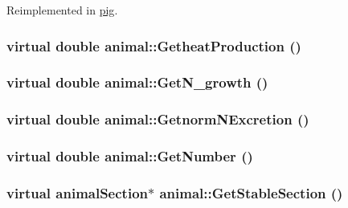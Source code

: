 Reimplemented in \hyperlink{classpig_aeb56ca7a77c1f27b7bc90ee4df0d4d1f}{pig}.\hypertarget{classanimal_a1530f8f6b797c184ea18dff86970100a}{
\subsubsection[{GetheatProduction}]{\setlength{\rightskip}{0pt plus 5cm}virtual double animal::GetheatProduction ()}}
\label{classanimal_a1530f8f6b797c184ea18dff86970100a}
\hypertarget{classanimal_a3bb4b70145b39791d77634f0a51435b9}{
\subsubsection[{GetN\_\-growth}]{\setlength{\rightskip}{0pt plus 5cm}virtual double animal::GetN\_\-growth ()}}
\label{classanimal_a3bb4b70145b39791d77634f0a51435b9}
\hypertarget{classanimal_ae10316ed2eb8bcf183540382bd67f0a3}{
\subsubsection[{GetnormNExcretion}]{\setlength{\rightskip}{0pt plus 5cm}virtual double animal::GetnormNExcretion ()}}
\label{classanimal_ae10316ed2eb8bcf183540382bd67f0a3}
\hypertarget{classanimal_acaf29d614c9931e3ddc1e39447d5b2f8}{
\subsubsection[{GetNumber}]{\setlength{\rightskip}{0pt plus 5cm}virtual double animal::GetNumber ()}}
\label{classanimal_acaf29d614c9931e3ddc1e39447d5b2f8}
\hypertarget{classanimal_a99d20eac6b06d781c35cf3f6fa9f5139}{
\subsubsection[{GetStableSection}]{\setlength{\rightskip}{0pt plus 5cm}virtual {\bf animalSection}$\ast$ animal::GetStableSection ()}}
\label{classanimal_a99d20eac6b06d781c35cf3f6fa9f5139}



